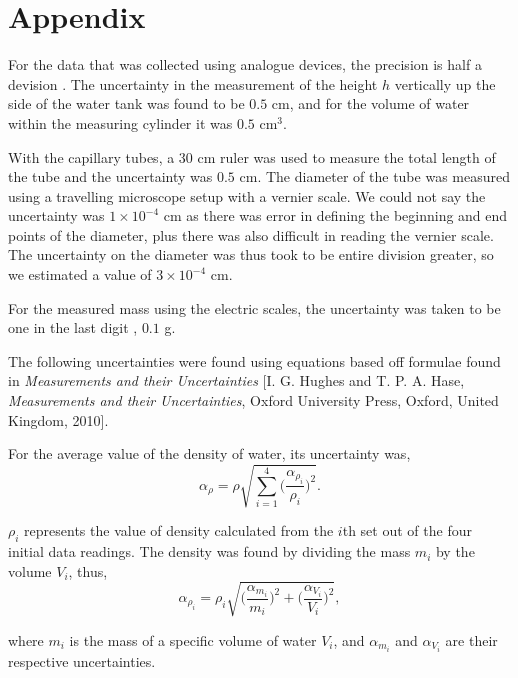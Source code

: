 \documentclass[twocolumn]{revtex4}
\begin{document}
\vfill
\twocolumngrid
\vspace{-3ex}
\section*{Appendix}
\vspace{-2ex}

For the data that was collected using analogue devices, the precision is half a devision \cite{crc}. The uncertainty in the measurement of the height $h$ vertically up the side of the water tank was found to be $0.5$ cm, and for the volume of water within the measuring cylinder it was $0.5$ cm$^{3}$. 

With the capillary tubes, a $30$ cm ruler was used to measure the total length of the tube and the uncertainty was $0.5$ cm. The diameter of the tube was measured using a travelling microscope setup with a vernier scale. We could not say the uncertainty was $1\times10^{-4}$ cm as there was error in defining the beginning and end points of the diameter, plus there was also difficult in reading the vernier scale. The uncertainty on the diameter was thus took to be entire division greater, so we estimated a value of $3\times10^{-4}$ cm. 

For the measured mass using the electric scales, the uncertainty was taken to be one in the last digit \cite{crc}, $0.1$ g.

The following uncertainties were found using equations based off formulae found in \textit{Measurements and their Uncertainties} [I. G. Hughes and T. P. A. Hase, \textit{Measurements and their Uncertainties}, Oxford University Press, Oxford, United Kingdom, 2010].

For the average value of the density of water, its uncertainty was,
\begin{equation} 
\alpha_{\rho} = \rho \sqrt{ \sum_{i=1}^{4} \Big( \frac{\alpha_{\rho_i}}{\rho_i} \Big)^2 }.
\label{ea-density}
\end{equation}

$\rho_i$ represents the value of density calculated from the $i$th set out of the four initial data readings. The density was found by dividing the mass $m_i$ by the volume $V_{i}$, thus,
\begin{equation} 
\alpha_{\rho_i} = \rho_i \sqrt{ \Bigg( \frac{\alpha_{m_i}}{m_i} \Bigg)^2 + \Bigg( \frac{\alpha_{V_i}}{V_i} \Bigg)^2 },
\label{ea-rho_error}
\end{equation}

where $m_i$ is the mass of a specific volume of water $V_i$, and $\alpha_{m_i}$ and  $\alpha_{V_i}$ are their respective uncertainties.
\end{document}
